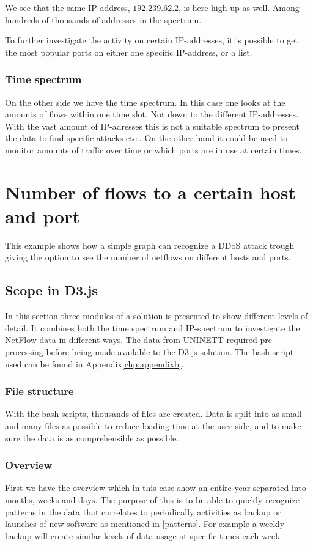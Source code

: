 We see that the same IP-address, $192.239.62.2$, is here high up as well. Among hundreds of thousands of addresses in the spectrum. 

To further investigate the activity on certain IP-addresses, it is possible to get the most popular ports on either one specific IP-address, or a list. 

\subsubsection{Time spectrum}
On the other side we have the time spectrum. In this case one looks at the amounts of flows within one time slot. Not down to the different IP-addresses. With the vast amount of IP-adresses this is not a suitable spectrum to present the data to find specific attacks etc.. On the other hand it could be used to monitor amounts of traffic over time or which ports are in use at certain times. 

\section{Number of flows to a certain host and port}
\label{sec:d3example}
This example shows how a simple graph can recognize a DDoS attack trough giving the option to see the number of netflows on different hosts and ports. 

\subsection{Scope in D3.js}
In this section three modules of a solution is presented to show different levels of detail. It combines both the time spectrum and IP-spectrum to investigate the NetFlow data in different ways. The data from UNINETT required pre-processing before being made available to the D3.js solution. The bash script used can be found in Appendix\ref{chp:appendixb}.

\subsubsection{File structure}
With the bash scripts, thousands of files are created. Data is split into as small and many files as possible to reduce loading time at the user side, and to make sure the data is as comprehensible as possible. 

\subsubsection{Overview}
First we have the overview which in this case show an entire year separated into months, weeks and days. 
The purpose of this is to be able to quickly recognize patterns in the data that correlates to periodically activities as backup or launches of new software as mentioned in \ref{patterns}. For example a weekly backup will create similar levels of data usage at specific times each week. 

